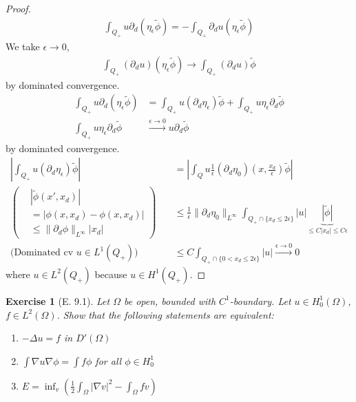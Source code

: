 \documentclass{report}
\theoremstyle{tommy}
\newtheorem{ex}[defn]{Exercise}
\begin{document}
\begin{proof}
      \begin{align*}
        \int_{Q_+} u \partial_d(\eta_\epsilon \tilde \phi) = - \int_{Q_+} \partial_d u(\eta_\epsilon \tilde \phi)
      \end{align*}
      We take \(\epsilon \to 0\), \begin{align*}
        \int_{Q_+} (\partial_d u) (\eta_\epsilon \tilde \phi) \to \int_{Q_+} (\partial_d u) \tilde \phi 
      \end{align*}
      by dominated convergence.
      \begin{align*}
        \int_{Q_+} u \partial_d(\eta_\epsilon \tilde \phi) &= \int_{Q_+} u(\partial_d \eta_\epsilon) \tilde \phi + \int_{Q_+} u \eta_\epsilon \partial_d \tilde \phi \\
        \int_{Q_+} u \eta_\epsilon \partial_d \tilde \phi &\xrightarrow{\epsilon \to 0} u \partial_d \tilde \phi
      \end{align*}
      by dominated convergence.
      \begin{align*}
        \left|\int_{Q_+} u(\partial_d \eta_\epsilon) \tilde \phi\right| &= \left|\int_{Q} u \frac{1}{\epsilon} (\partial_d \eta_0)\left(x,\frac{x_d}{\epsilon}\right) \tilde \phi\right| \\
        \left(\begin{aligned}
          &|\tilde \phi(x', x_d)| \\
        &= |\phi(x, x_d) - \phi(x,x_d)| \\
        &\le \|\partial_d \phi\|_{L^\infty}|x_d|
        \end{aligned}\right) \quad &\le \frac{1}{\epsilon} \|\partial_d \eta_0\|_{L^\infty} \int_{Q_+ \cap \{x_d \le 2 \epsilon\}}|u|\underbrace{|\tilde \phi|}_{\le C|x_d| \le C \epsilon} \\
        \text{(Dominated cv \(u \in L^1(Q_+)\))} \quad &\le C \int_{Q_+ \cap \{0 < x_d \le 2 \epsilon\}}|u|\xrightarrow{\epsilon \to 0} 0
      \end{align*}
      where \(u \in L^2(Q_+)\) because \(u \in H^1(Q_+)\).
  \end{proof}

  \begin{ex}[E. 9.1]
    Let \(\Omega\) be open, bounded with \(C^1\)-boundary. Let \(u \in H_0^1(\Omega)\), \(f \in L^2(\Omega)\). Show that the following statements are equivalent:
    \begin{enumerate}[label=\arabic*)]
      \item \(- \Delta u = f\) in \(D'(\Omega)\)
      \item \(\int \nabla u \nabla \phi = \int f \phi\) for all \(\phi \in H_0^1\)
      \item \(E = \inf_v \left(\frac{1}{2} \int_\Omega |\nabla v|^2 - \int_\Omega f v\right)\) 
    \end{enumerate}
  \end{ex}
\end{document}
